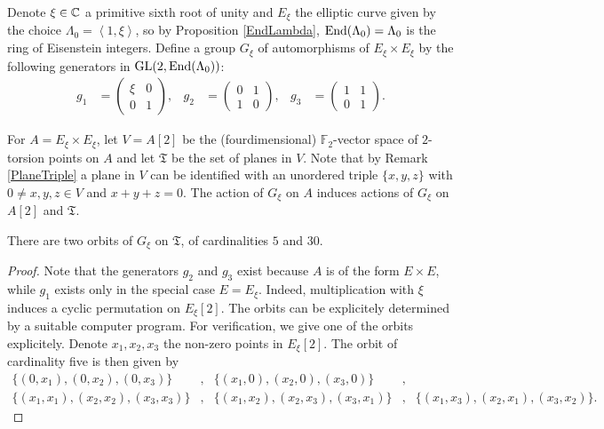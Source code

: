 \begin{definition}\label{elliptic6}
Denote $\xi\in\mathbb{C}$ a primitive sixth root of unity and $E_\xi$ the elliptic curve given by the choice $\Lambda_0 = \left<1,\xi\right>$, so by Proposition \ref{EndLambda}, $\operatorname{End}(\Lambda_0)=\Lambda_0$ is the ring of Eisenstein integers. Define a group $G_\xi$ of automorphisms of $E_\xi\times E_\xi$ by the following generators in $\operatorname{GL}(2,\operatorname{End}(\Lambda_0))$:
\begin{align*}
g_1 &= \left( {\begin{array}{cc}
   \xi & 0 \\       0 & 1      
   \end{array} } \right),
 &
g_2 &= \left( {\begin{array}{cc}
   0 & 1 \\       1 & 0      
   \end{array} } \right),
 &
g_3 &= \left( {\begin{array}{cc}
   1 & 1 \\       0 & 1     
   \end{array} } \right).
\end{align*}
\end{definition}
For $A=E_\xi\times E_\xi$, let $V =A[2]$ be the (fourdimensional) $\mathbb F_2$-vector space of $2$-torsion points on $A$ and let $\mathfrak T$ be the set of planes in $V$. Note that by Remark \ref{PlaneTriple} a plane in $V$ can be identified with an unordered triple $\{x,y,z\}$ with $0\neq x,y,z\in V$ and $x+y+z=0$. The action of $G_\xi$ on $A$ induces actions of $G_\xi$ on $A[2]$ and $\mathfrak T$. 
\begin{lemma}\label{orbitesG}
There are two orbits of $G_\xi$ on $\mathfrak T$, of cardinalities $5$ and $30$.
\end{lemma}
\begin{proof}
Note that the generators $g_2$ and $g_3$ exist because $A$ is of the form $E\times E$, while $g_1$ exists only in the special case $E=E_\xi$. Indeed, multiplication with $\xi$ induces a cyclic permutation on $E_\xi[2]$. 
The orbits can be explicitely determined by a suitable computer program. For verification, we give one of the orbits explicitely.
Denote $x_1,x_2,x_3$ the non-zero points in $E_\xi[2]$. The orbit of cardinality five is then given by
\begin{align*}
\{(0,x_1),(0,x_2),(0,x_3)\} &,& \{(x_1,0),(x_2,0),(x_3,0)\} &,& \\
\{(x_1,x_1),(x_2,x_2),(x_3,x_3)\} &,& \{(x_1,x_2),(x_2,x_3),(x_3,x_1)\} &,& \{(x_1,x_3),(x_2,x_1),(x_3,x_2)\}.
\end{align*}
\end{proof}

